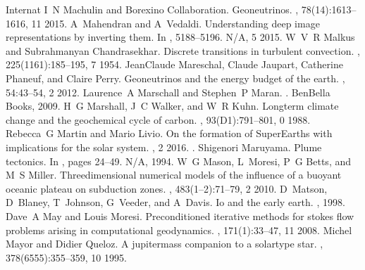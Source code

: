 \documentclass[letterpaper,10pt,english]{jupyterBook}
\begin{document}
\begin{sphinxthebibliography}{Internat}
I N Machulin and Borexino Collaboration. Geoneutrinos. , 78(14):1613–1616, 11 2015.
\sphinxAtStartPar
A Mahendran and A Vedaldi. Understanding deep image representations by inverting them. In , 5188–5196. N/A, 5 2015.
\sphinxAtStartPar
W V R Malkus and Subrahmanyan Chandrasekhar. Discrete transitions in turbulent convection. , 225(1161):185–195, 7 1954.
\sphinxAtStartPar
Jean\sphinxhyphen{}Claude Mareschal, Claude Jaupart, Catherine Phaneuf, and Claire Perry. Geoneutrinos and the energy budget of the earth. , 54:43–54, 2 2012.
\sphinxAtStartPar
Laurence A Marschall and Stephen P Maran. . BenBella Books, 2009.
\sphinxAtStartPar
H G Marshall, J C Walker, and W R Kuhn. Long\sphinxhyphen{}term climate change and the geochemical cycle of carbon. , 93(D1):791–801, 0 1988.
\sphinxAtStartPar
Rebecca G Martin and Mario Livio. On the formation of Super\sphinxhyphen{}Earths with implications for the solar system. , 2 2016. .
\sphinxAtStartPar
Shigenori Maruyama. Plume tectonics. In , pages 24–49. N/A, 1994.
\sphinxAtStartPar
W G Mason, L Moresi, P G Betts, and M S Miller. Three\sphinxhyphen{}dimensional numerical models of the influence of a buoyant oceanic plateau on subduction zones. , 483(1–2):71–79, 2 2010.
\sphinxAtStartPar
D Matson, D Blaney, T Johnson, G Veeder, and A Davis. Io and the early earth. , 1998.
\sphinxAtStartPar
Dave A May and Louis Moresi. Preconditioned iterative methods for stokes flow problems arising in computational geodynamics. , 171(1):33–47, 11 2008.
\sphinxAtStartPar
Michel Mayor and Didier Queloz. A jupiter\sphinxhyphen{}mass companion to a solar\sphinxhyphen{}type star. , 378(6555):355–359, 10 1995.

\end{sphinxthebibliography}
\end{document}
